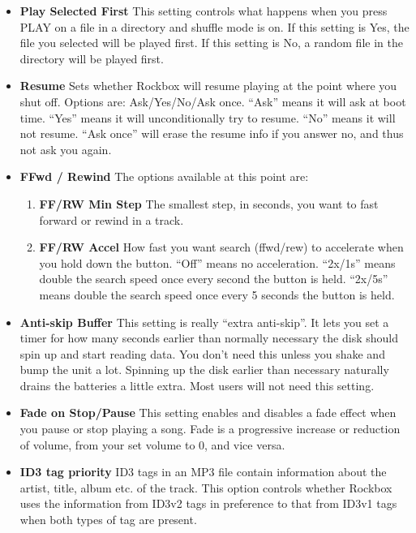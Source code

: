 \begin{itemize}
\begin{itemize}
  \item \textbf{Play Selected First}
    This setting controls what happens when you press PLAY on a file in a directory and shuffle mode is on. If this setting is Yes, the file you selected will be played first. If this setting is No, a random file in the directory will be played first.
  \item \textbf{Resume}
    Sets whether Rockbox will resume playing at the point where you shut off. Options are: Ask/Yes/No/Ask once. ``Ask'' means it will ask at boot time. ``Yes'' means it will unconditionally try to resume. ``No'' means it will not resume. ``Ask once'' will erase the resume info if you answer no, and thus not ask you again.
  \item \textbf{FFwd / Rewind}
    The options available at this point are:
    \begin{enumerate}
    \item \textbf{FF/RW Min Step}
      The smallest step, in seconds, you want to fast forward or rewind in a
      track.
    \item \textbf{FF/RW Accel}
      How fast you want search (ffwd/rew) to accelerate when you hold
      down the button. ``Off'' means no acceleration. ``2x/1s'' means double the
      search speed once every second the button is held. ``2x/5s'' means double the search speed once every 5 seconds the button is held.
    \end{enumerate}
    
  \item \textbf{Anti{}-skip Buffer}
    This setting is really ``extra anti{}-skip''. It lets you set a timer for how many seconds earlier than normally necessary the disk should spin up and start reading data. You don't need this unless you shake and bump the unit a lot. Spinning up the disk earlier than necessary naturally drains the batteries a little extra. Most users will not need this setting.
    
  \item \textbf{Fade on Stop/Pause}
    This setting enables and disables a fade effect when you pause or stop playing a song. Fade is a progressive increase or reduction of volume, from your set volume to 0, and vice versa.
    
  \item \textbf{ID3 tag priority}
    ID3 tags in an MP3 file contain information about the artist, title, album etc. of the track.  This option controls whether Rockbox uses the information from ID3v2 tags in preference to that from ID3v1 tags when both types of tag are present.
  \end{itemize}
  

\end{itemize}
